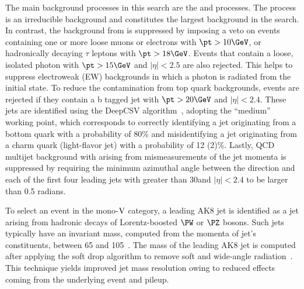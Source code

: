 The main background processes in this search are the \Zvvjets and \Wlvjets processes. The \Zvvjets process is an irreducible background and constitutes the largest background in the search. In contrast, the background from \Wlvjets is suppressed by imposing a veto on events containing one or more loose muons or electrons with $ \pt >10\GeV$, or hadronically decaying $\tau$ leptons with $\pt>18\GeV$. Events that contain a loose, isolated photon with $\pt>15\GeV$ and $|\eta| < 2.5$ are also rejected. This helps to suppress electroweak (EW) backgrounds in which a photon is radiated from the initial state.
To reduce the contamination from top quark backgrounds, events are rejected if they contain a b tagged jet with $\pt > 20\GeV$ and $|\eta| < 2.4$. These jets are identified using the DeepCSV algorithm~\cite{CMS_NOTE_2018-323,Sirunyan:2017ezt}, adopting the ``medium'' working point, which corresponds to correctly identifying a jet originating from a bottom quark with a probability of 80\% and misidentifying a jet originating from a charm quark (light-flavor jet) with a probability of 12 (2)\%. Lastly, QCD multijet background with \ETm arising from mismeasurements of the jet momenta is suppressed by requiring the minimum
azimuthal angle between the \ptvecmiss direction and each of the first four leading jets with \pt greater than 30\GeV and $|\eta| < 2.4$ to be larger than 0.5 radians.

To select an event in the mono-$\mathrm{V}$ category, a leading AK8 jet is identified as a jet arising from hadronic decays of Lorentz-boosted $\PW$ or $\PZ$ bosons.
Such jets typically have an invariant mass, computed from the momenta of jet's constituents, between 65 and 105\GeV~\cite{2017wyc}.
The mass of the leading AK8 jet is computed after applying the soft drop algorithm to remove soft and wide-angle radiation~\cite{Larkoski:2014wba}.
This technique yields improved jet mass resolution owing to reduced effects coming from the underlying event and pileup.

